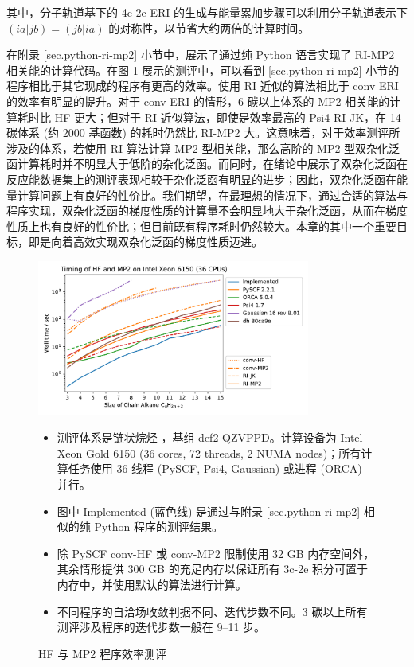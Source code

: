 其中，分子轨道基下的 4c-2e ERI 的生成与能量累加步骤可以利用分子轨道表示下 $(ia|jb) = (jb|ia)$ 的对称性，以节省大约两倍的计算时间。

在附录 \ref{sec.python-ri-mp2} 小节中，展示了通过纯 Python 语言实现了 RI-MP2 相关能的计算代码。在图 \ref{fig.timing-rimp2-implemented} 展示的测评中，可以看到 \ref{sec.python-ri-mp2} 小节的程序相比于其它现成的程序有更高的效率。使用 RI 近似的算法相比于 conv ERI 的效率有明显的提升。对于 conv ERI 的情形，6 碳以上体系的 MP2 相关能的计算耗时比 HF 更大；但对于 RI 近似算法，即使是效率最高的 Psi4 RI-JK，在 14 碳体系 (约 2000 基函数) 的耗时仍然比 RI-MP2 大。这意味着，对于效率测评所涉及的体系，若使用 RI 算法计算 MP2 型相关能，那么高阶的 MP2 型双杂化泛函计算耗时并不明显大于低阶的杂化泛函。而同时，\alert{在绪论中}展示了双杂化泛函在反应能数据集上的测评表现相较于杂化泛函有明显的进步；因此，双杂化泛函在能量计算问题上有良好的性价比。我们期望，在最理想的情况下，通过合适的算法与程序实现，双杂化泛函的梯度性质的计算量不会明显地大于杂化泛函，从而在梯度性质上也有良好的性价比；但目前既有程序耗时仍然较大。本章的其中一个重要目标，即是向着高效实现双杂化泛函的梯度性质迈进。

\begin{figure}
  \centering
  \caption{HF 与 MP2 程序效率测评}
  \label{fig.timing-rimp2-implemented}
  \includegraphics[width=0.8\textwidth]{assets/timing-rimp2-implemented.pdf}

  \raggedright
  \begin{itemize}[nosep]
    \item 测评体系是链状烷烃 ，基组 def2-QZVPPD。计算设备为 Intel Xeon Gold 6150 (36 cores, 72 threads, 2 NUMA nodes)；所有计算任务使用 36 线程 (PySCF, Psi4, Gaussian) 或进程 (ORCA) 并行。
    \item 图中 Implemented (蓝色线) 是通过与附录 \ref{sec.python-ri-mp2} 相似的纯 Python 程序的测评结果。
    \item 除 PySCF conv-HF 或 conv-MP2 限制使用 32 GB 内存空间外，其余情形提供 300 GB 的充足内存以保证所有 3c-2e 积分可置于内存中，并使用默认的算法进行计算。
    \item 不同程序的自洽场收敛判据不同、迭代步数不同。3 碳以上所有测评涉及程序的迭代步数一般在 9--11 步。
  \end{itemize}
\end{figure}

